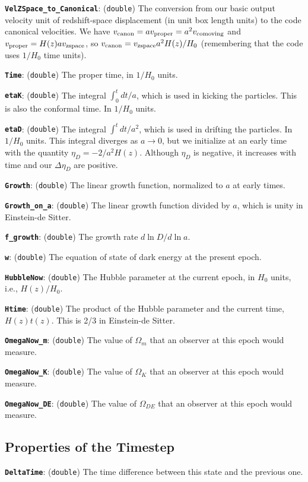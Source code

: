\documentclass[11pt,preprint]{aastex}
\newcommand{\param}[2]{\medskip\noindent\textbf{\texttt{#1}}: ({\tt #2}) }
\begin{document}
\param{VelZSpace\_to\_Canonical}{double} The conversion from our basic
output velocity unit of redshift-space displacement (in unit box
length units) to the code canonical velocities. 
We have $v_{\rm canon} = a v_{\rm proper} = a^2 v_{\rm comoving}$
and $v_{\rm proper} = H(z) a v_{\rm zspace}$, so
$v_{\rm canon} = v_{\rm zspace} a^2 H(z)/H_0$ (remembering that
the code uses $1/H_0$ time units).

\param{Time}{double} The proper time, in $1/H_0$ units.

\param{etaK}{double} The integral $\int_0^t dt/a$, which is used
in kicking the particles.  This is also the conformal time.  In
$1/H_0$ units.

\param{etaD}{double} The integral $\int^t dt/a^2$, which is used
in drifting the particles.  In $1/H_0$ units.  This integral diverges
as $a\rightarrow0$, but we initialize at an early time with the 
quantity $\eta_D = -2/a^2 H(z)$.  Although $\eta_D$ is negative,
it increases with time and our $\Delta\eta_D$ are positive.

\param{Growth}{double} The linear growth function, normalized to $a$ at early times.

\param{Growth\_on\_a}{double} The linear growth function divided by
$a$, which is unity in Einstein-de Sitter.

\param{f\_growth}{double} The growth rate $d\ln D/d\ln a$.

\param{w}{double} The equation of state of dark energy at the present epoch.

\param{HubbleNow}{double} The Hubble parameter at the current epoch,
in $H_0$ units, i.e., $H(z)/H_0$.

\param{Htime}{double} The product of the Hubble parameter and the
current time, $H(z) t(z)$.  This is 2/3 in Einstein-de Sitter.

\param{OmegaNow\_m}{double} The value of $\Omega_m$ that an observer
at this epoch would measure.

\param{OmegaNow\_K}{double} The value of $\Omega_K$ that an observer
at this epoch would measure.

\param{OmegaNow\_DE}{double} The value of $\Omega_{DE}$ that an
observer at this epoch would measure.

\subsection{Properties of the Timestep}

\param{DeltaTime}{double} The time difference between this state
and the previous one.
\end{document}
